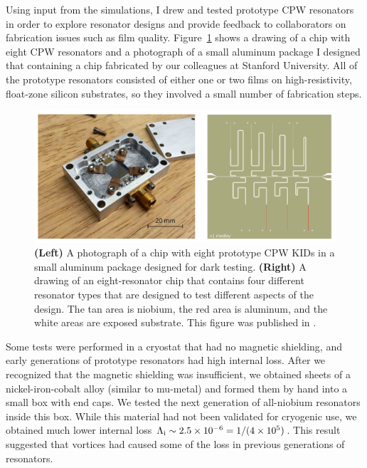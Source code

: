 Using input from the simulations, I drew and tested prototype CPW resonators in order to explore resonator designs and provide feedback to collaborators on fabrication issues such as film quality.
Figure~\ref{fig:multichroic_prototypes} shows a drawing of a chip with eight CPW resonators and a photograph of a small aluminum package I designed that containing a chip fabricated by our colleagues at Stanford University. %
All of the prototype resonators consisted of either one or two films on high-resistivity, float-zone silicon substrates, so they involved a small number of fabrication steps.

\begin{figure}[htb]
\centering
\includegraphics[width=\textwidth]{multichroic/multichroic_prototypes.pdf}
\caption[A photograph and a drawing of a chip with eight prototype resonators.]
{
\textbf{(Left)}
A photograph of a chip with eight prototype CPW KIDs in a small aluminum package designed for dark testing.
\textbf{(Right)}
A drawing of an eight-resonator chip that contains four different resonator types that are designed to test different aspects of the design.
The tan area is niobium, the red area is aluminum, and the white areas are exposed substrate.
This figure was published in \textcite{Johnson2016SPIE}.
}
\label{fig:multichroic_prototypes}
\end{figure}

Some tests were performed in a cryostat that had no magnetic shielding, and early generations of prototype resonators had high internal loss.
After we recognized that the magnetic shielding was insufficient, we obtained sheets of a nickel-iron-cobalt alloy (similar to mu-metal) and formed them by hand into a small box with end caps.
We tested the next generation of all-niobium resonators inside this box.
While this material had not been validated for cryogenic use, we obtained much lower internal loss
$\Lambda_{\mathrm{i}} \sim \num{2.5e-6} = 1 / (\num{4e5})$.
This result suggested that vortices had caused some of the loss in previous generations of resonators.

